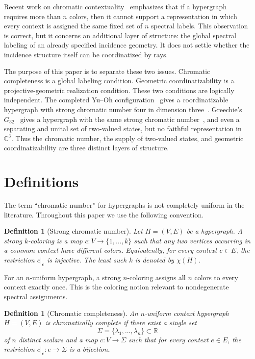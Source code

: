 \documentclass[aps,pra,twocolumn,superscriptaddress,10pt]{revtex4-2}
\newtheorem{definition}[theorem]{Definition}
\newcommand{\C}{\mathbb{C}}
\newcommand{\R}{\mathbb{R}}
\begin{document}
Recent work on chromatic contextuality~\cite{svozil-2021-chroma,svozil-2025-color} emphasizes that if a hypergraph requires more than $n$
colors, then it cannot support a representation in which every context is
assigned the same fixed set of $n$ spectral labels.  This observation is
correct, but it concerns an additional layer of structure: the global
spectral labeling of an already specified incidence geometry.  It does not
settle whether the incidence structure itself can be coordinatized by rays.

The purpose of this paper is to separate these two issues.  Chromatic
completeness is a global labeling condition.  Geometric coordinatizability is
a projective-geometric realization condition.  These two conditions are
logically independent.  The completed Yu--Oh configuration~\cite{Yu-2012} gives a
coordinatizable hypergraph with strong chromatic number four in dimension
three~\cite{svozil-2025-color}.
Greechie's $G_{32}$~\cite{greechie:71} gives a hypergraph with the same strong chromatic
number~\cite{svozil-2021-chroma}, and even a separating and unital set of two-valued states, but no
faithful representation in $\C^3$.  Thus the chromatic number, the supply of
two-valued states, and geometric coordinatizability are three distinct layers
of structure.

\section{Definitions}

The term ``chromatic number'' for hypergraphs is not completely uniform in
the literature.  Throughout this paper we use the following convention.

\begin{definition}[Strong chromatic number]
Let $H=(V,E)$ be a hypergraph.  A \emph{strong $k$-coloring} is a map
$c:V\to\{1,\ldots,k\}$ such that any two vertices occurring in a common
context have different colors.  Equivalently, for every context
$e\in E$, the restriction $c|_e$ is injective.  The least such $k$ is denoted
by $\chi(H)$.
\end{definition}

For an $n$-uniform hypergraph, a strong $n$-coloring assigns all $n$ colors
to every context exactly once.  This is the coloring notion relevant to
nondegenerate spectral assignments.

\begin{definition}[Chromatic completeness]\label{def:chromatic-completeness}
An $n$-uniform context hypergraph $H=(V,E)$ is \emph{chromatically complete}
if there exist a single set
\[
    \Sigma=\{\lambda_1,\ldots,\lambda_n\}\subset\R
\]
of $n$ distinct scalars and a map $c:V\to\Sigma$ such that for every context
$e\in E$, the restriction $c|_e:e\to\Sigma$ is a bijection.
\end{definition}
\end{document}
